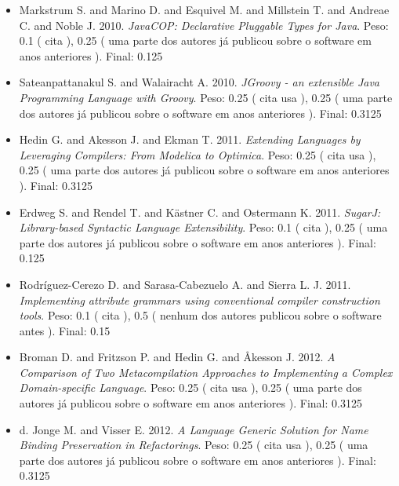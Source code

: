 \begin{itemize}
\item Markstrum S. and Marino D. and Esquivel M. and Millstein T. and Andreae C. and Noble J.
      2010.
        \textit{ JavaCOP: Declarative Pluggable Types for Java}.
      Peso:
      0.1 (
          cita
      ),
      0.25 (
uma parte dos autores já publicou sobre o software em anos anteriores
      ).
      Final:
      0.125

\item Sateanpattanakul S. and Walairacht A.
      2010.
        \textit{ JGroovy - an extensible Java Programming Language with Groovy}.
      Peso:
      0.25 (
          cita
          usa
      ),
      0.25 (
uma parte dos autores já publicou sobre o software em anos anteriores
      ).
      Final:
      0.3125

\item Hedin G. and Akesson J. and Ekman T.
      2011.
        \textit{ Extending Languages by Leveraging Compilers: From Modelica to Optimica}.
      Peso:
      0.25 (
          cita
          usa
      ),
      0.25 (
uma parte dos autores já publicou sobre o software em anos anteriores
      ).
      Final:
      0.3125

\item Erdweg S. and Rendel T. and K\"{a}stner C. and Ostermann K.
      2011.
        \textit{ SugarJ: Library-based Syntactic Language Extensibility}.
      Peso:
      0.1 (
          cita
      ),
      0.25 (
uma parte dos autores já publicou sobre o software em anos anteriores
      ).
      Final:
      0.125

\item Rodríguez-Cerezo D. and Sarasa-Cabezuelo A. and Sierra L. J.
      2011.
        \textit{ Implementing attribute grammars using conventional compiler construction tools}.
      Peso:
      0.1 (
          cita
      ),
      0.5 (
nenhum dos autores publicou sobre o software antes
      ).
      Final:
      0.15

\item Broman D. and Fritzson P. and Hedin G. and Åkesson J.
      2012.
        \textit{ A Comparison of Two Metacompilation Approaches to Implementing a Complex Domain-specific Language}.
      Peso:
      0.25 (
          cita
          usa
      ),
      0.25 (
uma parte dos autores já publicou sobre o software em anos anteriores
      ).
      Final:
      0.3125

\item d. Jonge M. and Visser E.
      2012.
        \textit{ A Language Generic Solution for Name Binding Preservation in Refactorings}.
      Peso:
      0.25 (
          cita
          usa
      ),
      0.25 (
uma parte dos autores já publicou sobre o software em anos anteriores
      ).
      Final:
      0.3125


\end{itemize}
